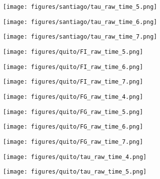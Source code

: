 \documentclass[a4paper]{article}
\def\lthtmlcheckvsize{\ifdim\ht\sizebox<\vsize 
  \ifdim\wd\sizebox<\hsize\expandafter\hfill\fi \expandafter\vfill
  \else\expandafter\vss\fi}%
\begin{document}
{\newpage\clearpage
{}%
\texttt{[image: figures/santiago/tau\_raw\_time\_5.png]}%
\lthtmlpictureZ
\lthtmlcheckvsize\clearpage}

{\newpage\clearpage
{}%
\texttt{[image: figures/santiago/tau\_raw\_time\_6.png]}%
\lthtmlpictureZ
\lthtmlcheckvsize\clearpage}

{\newpage\clearpage
{}%
\texttt{[image: figures/santiago/tau\_raw\_time\_7.png]}%
\lthtmlpictureZ
\lthtmlcheckvsize\clearpage}

{\newpage\clearpage
{}%
\texttt{[image: figures/quito/FI\_raw\_time\_5.png]}%
\lthtmlpictureZ
\lthtmlcheckvsize\clearpage}

{\newpage\clearpage
{}%
\texttt{[image: figures/quito/FI\_raw\_time\_6.png]}%
\lthtmlpictureZ
\lthtmlcheckvsize\clearpage}

{\newpage\clearpage
{}%
\texttt{[image: figures/quito/FI\_raw\_time\_7.png]}%
\lthtmlpictureZ
\lthtmlcheckvsize\clearpage}

{\newpage\clearpage
{}%
\texttt{[image: figures/quito/FG\_raw\_time\_4.png]}%
\lthtmlpictureZ
\lthtmlcheckvsize\clearpage}

{\newpage\clearpage
{}%
\texttt{[image: figures/quito/FG\_raw\_time\_5.png]}%
\lthtmlpictureZ
\lthtmlcheckvsize\clearpage}

{\newpage\clearpage
{}%
\texttt{[image: figures/quito/FG\_raw\_time\_6.png]}%
\lthtmlpictureZ
\lthtmlcheckvsize\clearpage}

{\newpage\clearpage
{}%
\texttt{[image: figures/quito/FG\_raw\_time\_7.png]}%
\lthtmlpictureZ
\lthtmlcheckvsize\clearpage}

{\newpage\clearpage
{}%
\texttt{[image: figures/quito/tau\_raw\_time\_4.png]}%
\lthtmlpictureZ
\lthtmlcheckvsize\clearpage}

{\newpage\clearpage
{}%
\texttt{[image: figures/quito/tau\_raw\_time\_5.png]}%
\lthtmlpictureZ
\lthtmlcheckvsize\clearpage}
\end{document}
